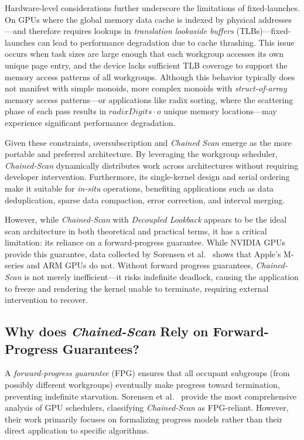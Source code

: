 \documentclass[sigconf]{acmart}
\begin{document}
Hardware-level considerations further underscore the limitations of fixed-launches. On GPUs where the global memory data cache is indexed by physical addresses---and therefore requires lookups in \emph{translation lookaside buffers} (TLBs)---fixed-launches can lead to performance degradation due to cache thrashing. This issue occurs when task sizes are large enough that each workgroup accesses its own unique page entry, and the device lacks sufficient TLB coverage to support the memory access patterns of all workgroups. Although this behavior typically does not manifest with simple monoids, more complex monoids with \emph{struct-of-array} memory access patterns---or applications like radix sorting, where the scattering phase of each pass results in $radixDigits \cdot o$ unique memory locations---may experience significant performance degradation.

Given these constraints, oversubscription and \emph{Chained Scan} emerge as the more portable and preferred architecture. By leveraging the workgroup scheduler, \emph{Chained-Scan} dynamically distributes work across architectures without requiring developer intervention. Furthermore, its single-kernel design and serial ordering make it suitable for \emph{in-situ} operations, benefiting applications such as data deduplication, sparse data compaction, error correction, and interval merging.

However, while \emph{Chained-Scan} with \emph{Decoupled Lookback} appears to be the ideal scan architecture in both theoretical and practical terms, it has a critical limitation: its reliance on a forward-progress guarantee. While NVIDIA GPUs provide this guarantee, data collected by Sorensen et al.~\cite{sorensen2021} shows that Apple’s M-series and ARM GPUs do not. Without forward progress guarantees, \emph{Chained-Scan} is not merely inefficient—it risks indefinite deadlock, causing the application to freeze and rendering the kernel unable to terminate, requiring external intervention to recover.

\subsection{Why does \emph{Chained-Scan} Rely on Forward-Progress Guarantees?}
A \emph{forward-progress guarantee} (FPG) ensures that all occupant subgroups (from possibly different workgroups) eventually make progress toward termination, preventing indefinite starvation. Sorensen et al.~\cite{sorensen2018,sorensen2021} provide the most comprehensive analysis of GPU schedulers, classifying \emph{Chained-Scan} as FPG-reliant. However, their work primarily focuses on formalizing progress models rather than their direct application to specific algorithms.
\end{document}
